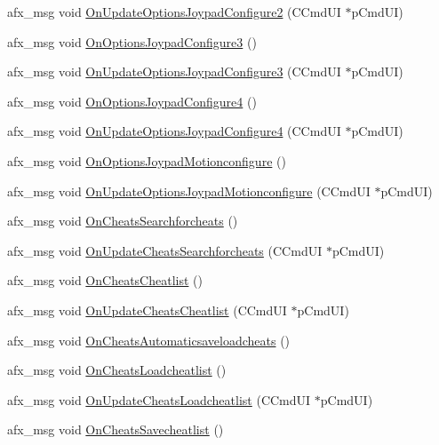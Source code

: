 \begin{DoxyCompactItemize}
afx\+\_\+msg void \mbox{\hyperlink{class_main_wnd_aab2ac316b4151d3235065ddb6fae1c42}{On\+Update\+Options\+Joypad\+Configure2}} (C\+Cmd\+UI $\ast$p\+Cmd\+UI)
\item 
afx\+\_\+msg void \mbox{\hyperlink{class_main_wnd_a0def1429ded1fc96ecdda38a7e5257b8}{On\+Options\+Joypad\+Configure3}} ()
\item 
afx\+\_\+msg void \mbox{\hyperlink{class_main_wnd_adce78783951780ef126850460c0d058e}{On\+Update\+Options\+Joypad\+Configure3}} (C\+Cmd\+UI $\ast$p\+Cmd\+UI)
\item 
afx\+\_\+msg void \mbox{\hyperlink{class_main_wnd_afc6e9e67b71193dca7d906bb62ad259b}{On\+Options\+Joypad\+Configure4}} ()
\item 
afx\+\_\+msg void \mbox{\hyperlink{class_main_wnd_ab4e1c44549ff60b9c38c2ef34b7139a1}{On\+Update\+Options\+Joypad\+Configure4}} (C\+Cmd\+UI $\ast$p\+Cmd\+UI)
\item 
afx\+\_\+msg void \mbox{\hyperlink{class_main_wnd_a53193c4dc50dce98008dfbd3644ee1ca}{On\+Options\+Joypad\+Motionconfigure}} ()
\item 
afx\+\_\+msg void \mbox{\hyperlink{class_main_wnd_a3fd5aad599ccaff89fc20fb38a7c93d6}{On\+Update\+Options\+Joypad\+Motionconfigure}} (C\+Cmd\+UI $\ast$p\+Cmd\+UI)
\item 
afx\+\_\+msg void \mbox{\hyperlink{class_main_wnd_aab3f78322d45b6e9300a8399b19bf35a}{On\+Cheats\+Searchforcheats}} ()
\item 
afx\+\_\+msg void \mbox{\hyperlink{class_main_wnd_aa8d542452917aad684d8762790c74e96}{On\+Update\+Cheats\+Searchforcheats}} (C\+Cmd\+UI $\ast$p\+Cmd\+UI)
\item 
afx\+\_\+msg void \mbox{\hyperlink{class_main_wnd_a1559502f63289fd4d3414ef1a287b1d8}{On\+Cheats\+Cheatlist}} ()
\item 
afx\+\_\+msg void \mbox{\hyperlink{class_main_wnd_ae88de7e8f7d73a87e5f3bb1ffa28a792}{On\+Update\+Cheats\+Cheatlist}} (C\+Cmd\+UI $\ast$p\+Cmd\+UI)
\item 
afx\+\_\+msg void \mbox{\hyperlink{class_main_wnd_acf3525f8b6804fb4fcc4332d976c9961}{On\+Cheats\+Automaticsaveloadcheats}} ()
\item 
afx\+\_\+msg void \mbox{\hyperlink{class_main_wnd_a576e72b77e11a1e9f92b00279023b755}{On\+Cheats\+Loadcheatlist}} ()
\item 
afx\+\_\+msg void \mbox{\hyperlink{class_main_wnd_a1afd028f12bc4f140adbf5cd052b62f4}{On\+Update\+Cheats\+Loadcheatlist}} (C\+Cmd\+UI $\ast$p\+Cmd\+UI)
\item 
afx\+\_\+msg void \mbox{\hyperlink{class_main_wnd_a460ab90b938c269df34be6d15777eb14}{On\+Cheats\+Savecheatlist}} ()

\end{DoxyCompactItemize}
